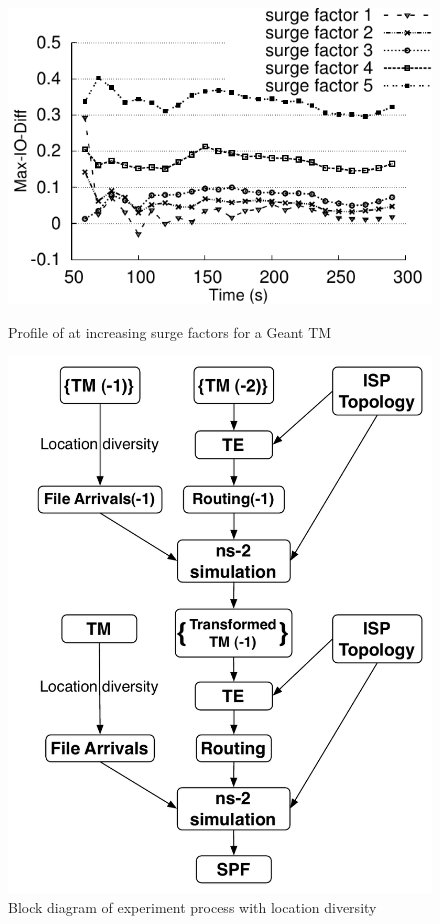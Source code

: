\begin{figure}
\begin{minipage}{0.45\textwidth}
\includegraphics[scale=0.55]{final_images/G5_IOdiff/i_o_diff_plot.pdf}
  \caption{Profile of \maxiodiff{} at increasing surge factors for a Geant TM}
  \label{fig:input_output_diff}
\end{minipage}
\hspace{1cm}
\begin{minipage}{0.45\textwidth}
\includegraphics[scale=0.4]{final_images/Simulation2.pdf}
\caption{Block diagram of experiment process with location diversity}
 \label{fig:simulation2}
\end{minipage}
\end{figure}


